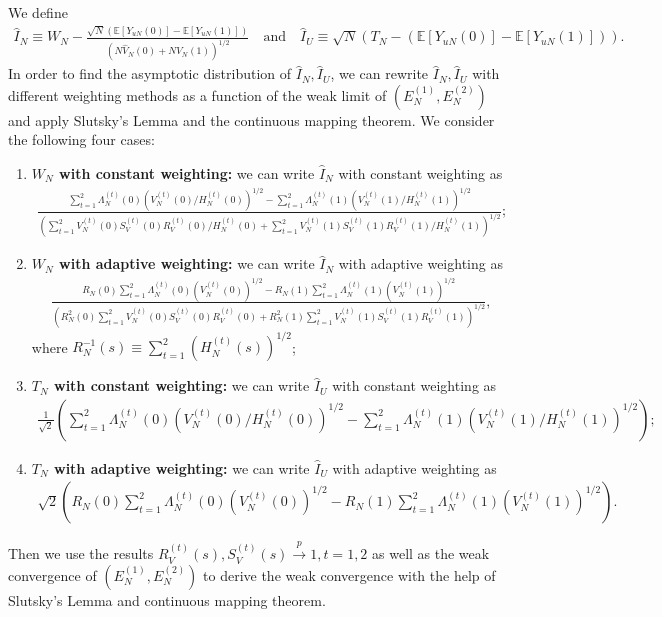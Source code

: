 \documentclass[12pt]{article}
\newcommand{\E}{\mathbb E}								%
\newcommand{\convp}{\overset p \rightarrow}             %
\begin{document}
We define 
\small
\begin{align*}
	\hat{I}_N\equiv W_N-\frac{\sqrt{N}(\E[Y_{uN}(0)]-\E[Y_{uN}(1)])}{(N\hat{V}_N(0)+N\hat{V}_N(1))^{1/2}}\quad\text{and}\quad\hat{I}_{U}\equiv \sqrt{N}(T_N-(\E[Y_{uN}(0)]-\E[Y_{uN}(1)])).
\end{align*}
\normalsize
In order to find the asymptotic distribution of $\hat{I}_N,\hat{I}_U$, we can rewrite $\hat{I}_N,\hat{I}_U$ with different weighting methods as a function of the weak limit of $(E_{N}^{(1)},E_{N}^{(2)})$ and apply Slutsky's Lemma and the continuous mapping theorem. We consider the following four cases:
\begin{enumerate}
	\item \textbf{$W_N$ with constant weighting:} we can write $\hat{I}_N$ with constant weighting as
	\begin{align*}
		\frac{\sum_{t=1}^2\Lambda_N^{(t)}(0)(V_N^{(t)}(0)/H_N^{(t)}(0))^{1/2} -\sum_{t=1}^2\Lambda_N^{(t)}(1) (V_N^{(t)}(1)/H_N^{(t)}(1))^{1/2}}{(\sum_{t=1}^2V_N^{(t)}(0) S_V^{(t)}(0) R_V^{(t)}(0)/H_N^{(t)}(0)+\sum_{t=1}^2V_N^{(t)}(1) S_V^{(t)}(1)R_V^{(t)}(1)/H_N^{(t)}(1))^{1/2}};
	\end{align*}
	\item \textbf{$W_N$ with adaptive weighting:} we can write $\hat{I}_N$ with adaptive weighting as
	\begin{align*}
		\frac{R_N(0)\sum_{t=1}^2\Lambda_N^{(t)}(0)(V_N^{(t)}(0))^{1/2} -R_N(1) \sum_{t=1}^2\Lambda_N^{(t)}(1) (V_N^{(t)}(1))^{1/2}}{(R_N^2(0)\sum_{t=1}^2V_N^{(t)}(0) S_V^{(t)}(0) R_V^{(t)}(0)+R_N^2(1)\sum_{t=1}^2V_N^{(t)}(1) S_V^{(t)}(1)R_V^{(t)}(1))^{1/2}},
	\end{align*}
	where $R_N^{-1}(s)\equiv \sum_{t=1}^2 (H_N^{(t)}(s))^{1/2}$;
	\item \textbf{$T_N$ with constant weighting:} we can write $\hat{I}_U$ with constant weighting as
	\begin{align*}
		\frac{1}{\sqrt{2}}\left(\sum_{t=1}^2\Lambda_N^{(t)}(0)(V_N^{(t)}(0)/H_N^{(t)}(0))^{1/2} -\sum_{t=1}^2\Lambda_N^{(t)}(1) (V_N^{(t)}(1)/H_N^{(t)}(1))^{1/2}\right);
	\end{align*}
	\item \textbf{$T_N$ with adaptive weighting:} we can write $\hat{I}_U$ with adaptive weighting as 
	\begin{align*}
		\sqrt{2}\left(R_N(0)\sum_{t=1}^2\Lambda_N^{(t)}(0)(V_N^{(t)}(0))^{1/2} -R_N(1) \sum_{t=1}^2\Lambda_N^{(t)}(1) (V_N^{(t)}(1))^{1/2}\right).
	\end{align*}
\end{enumerate} 
Then we use the results $R_V^{(t)}(s),S_V^{(t)}(s)\convp 1,t=1,2$ as well as the weak convergence of $(E_{N}^{(1)},E_{N}^{(2)})$ to derive the weak convergence with the help of Slutsky's Lemma and continuous mapping theorem. 
\end{document}
